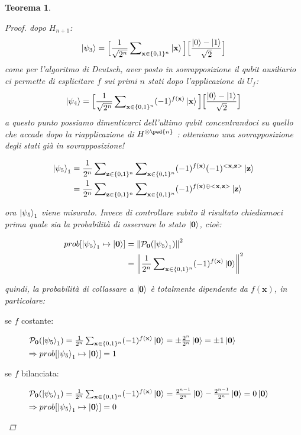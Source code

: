 \documentclass[12pt,a4paper,openright]{report}
\newcommand*\xor{\mathbin{\oplus}}
\newcommand{\norm}[1]{\left\lVert#1\right\rVert}
\newtheorem{mythm}{Teorema}[chapter]
\begin{document}
\begin{mythm}
\begin{proof}
dopo $H_{n+1}$:
\[
    \ket{\psi_3} = \Big[\frac{1}{\sqrt{2^n}}\sum\nolimits_{\textbf{x}\in{\{0,1\}^n}}\ket{\textbf{x}}\Big]\Big[\frac{\ket{0}-\ket{1}}{\sqrt2}\Big]
\]
come per l'algoritmo di Deutsch, aver posto in sovrapposizione il qubit ausiliario ci permette di esplicitare $f$ sui primi $n$ stati dopo l'applicazione di $U_f$:
\[
    \ket{\psi_4} = \Big[\frac{1}{\sqrt{2^n}}\sum\nolimits_{\textbf{x}\in{\{0,1\}^n}}(-1)^{f(\textbf{x})}\ket{\textbf{x}}\Big]\Big[\frac{\ket{0}-\ket{1}}{\sqrt2}\Big]
\]
a questo punto possiamo dimenticarci dell'ultimo qubit concentrandoci su quello che accade dopo la riapplicazione di $H^{\otimes\ped{n}}$ : otteniamo una sovrapposizione degli stati già in sovrapposizione!
\begin{center}
    \begin{align*}
        \ket{\psi_5}_1 &= \frac{1}{2^n}\sum\nolimits_{\textbf{z}\in{\{0,1\}^n}} \sum\nolimits_{\textbf{x}\in{\{0,1\}^n}}(-1)^{f(\textbf{x})}(-1)^{<\textbf{x},\textbf{z}>}\ket{\textbf{z}} \\
                       &= \frac{1}{2^n}\sum\nolimits_{\textbf{z}\in{\{0,1\}^n}} \sum\nolimits_{\textbf{x}\in{\{0,1\}^n}}(-1)^{f(\textbf{x}) \xor <\textbf{x},\textbf{z}>}\ket{\textbf{z}}
    \end{align*}
\end{center}
ora $\ket{\psi_5}_1$ viene misurato. Invece di controllare subito il risultato chiediamoci prima quale sia la probabilità di osservare lo stato $\ket{\textbf{0}}$, cioè:
\begin{center}
    \begin{align*}
        prob[\ket{\psi_5}_1 \mapsto \ket{\textbf{0}}] &= \norm{\mathcal{P}_{\textbf{0}}(\ket{\psi_5}_1)}^2\\
                                                      &= \norm{\frac{1}{2^n}\sum\nolimits_{\textbf{x}\in{\{0,1\}^n}}(-1)^{f(\textbf{x})}\ket{\textbf{0}}}^2
    \end{align*}
\end{center}
quindi, la probabilità di collassare a $\ket{\textbf{0}}$ è totalmente dipendente da $f(\textbf{x})$, in particolare:
\begin{description}
    \item [se $f$ costante:] $\mathcal{P}_{\textbf{0}}(\ket{\psi_5}_1) = \frac{1}{2^n}\sum\nolimits_{\textbf{x}\in{\{0,1\}^n}}(-1)^{f(\textbf{x})}\ket{\textbf{0}} = \pm \frac{2^n}{2^n}\ket{\textbf{0}} = \pm 1\ket{\textbf{0}}$ \\
    $\Rightarrow prob[\ket{\psi_5}_1 \mapsto \ket{\textbf{0}}] = 1$
    \item [se $f$ bilanciata:] $\mathcal{P}_{\textbf{0}}(\ket{\psi_5}_1) = \frac{1}{2^n}\sum\nolimits_{\textbf{x}\in{\{0,1\}^n}}(-1)^{f(\textbf{x})}\ket{\textbf{0}} =  \frac{2^{n-1}}{2^n}\ket{\textbf{0}} - \frac{2^{n-1}}{2^n}\ket{\textbf{0}} = 0\ket{\textbf{0}}$\\
    $\Rightarrow prob[\ket{\psi_5}_1 \mapsto \ket{\textbf{0}}] = 0$
\end{description} 


\end{proof}
\end{mythm}
\end{document}
